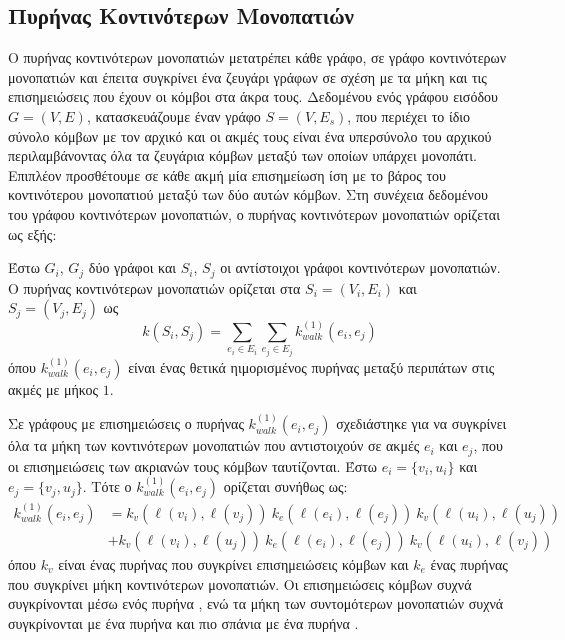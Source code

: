 \subsection{Πυρήνας Κοντινότερων Μονοπατιών}
\label{ssec:sp}
Ο πυρήνας κοντινότερων μονοπατιών  μετατρέπει κάθε γράφο, σε γράφο κοντινότερων μονοπατιών και έπειτα συγκρίνει ένα ζευγάρι γράφων σε σχέση με τα μήκη και τις επισημειώσεις που έχουν οι κόμβοι στα άκρα τους.
Δεδομένου ενός γράφου εισόδου $G=(V,E)$, κατασκευάζουμε έναν γράφο  $S=(V,E_s)$, που περιέχει το ίδιο σύνολο κόμβων με τον αρχικό και οι ακμές τους είναι ένα υπερσύνολο του αρχικού περιλαμβάνοντας όλα τα ζευγάρια κόμβων μεταξύ των οποίων υπάρχει μονοπάτι.
Επιπλέον προσθέτουμε σε κάθε ακμή μία επισημείωση ίση με το βάρος του κοντινότερου μονοπατιού μεταξύ των δύο αυτών κόμβων.
Στη συνέχεια δεδομένου του γράφου κοντινότερων μονοπατιών, ο πυρήνας κοντινότερων μονοπατιών ορίζεται ως εξής:
\begin{definition}
	Έστω $G_i$, $G_j$ δύο γράφοι και $S_i$, $S_j$ οι αντίστοιχοι γράφοι κοντινότερων μονοπατιών.
	Ο πυρήνας κοντινότερων μονοπατιών ορίζεται στα $S_i=(V_i,E_i)$ και $S_j=(V_j,E_j)$ ως
	\begin{equation}
		k(S_i,S_j) = \sum_{e_i \in E_i} \sum_{e_j \in E_j} k_{walk}^{(1)}(e_i, e_j)
	\end{equation}
	όπου $k_{walk}^{(1)}(e_i, e_j)$ είναι ένας θετικά ηιμορισμένος πυρήνας μεταξύ περιπάτων στις ακμές με μήκος $1$.
\end{definition}
Σε γράφους με επισημειώσεις ο πυρήνας $k_{walk}^{(1)}(e_i, e_j)$ σχεδιάστηκε για να συγκρίνει όλα τα μήκη των κοντινότερων μονοπατιών που αντιστοιχούν σε ακμές $e_i$ και $e_j$, που οι επισημειώσεις των ακριανών τους κόμβων ταυτίζονται.
Έστω $e_i = \{v_i, u_i\}$ και $e_j = \{v_j, u_j\}$.
Τότε ο $k_{walk}^{(1)}(e_i, e_j)$ ορίζεται συνήθως ως:
\begin{equation}
\begin{split}
	k_{walk}^{(1)}(e_i, e_j) &= k_v(\ell(v_i),\ell(v_j)) \ k_e(\ell(e_i),\ell(e_j)) \ k_v(\ell(u_i),\ell(u_j)) \\
	&+ k_v(\ell(v_i),\ell(u_j)) \ k_e(\ell(e_i),\ell(e_j)) \ k_v(\ell(u_i),\ell(v_j))
\end{split}
\end{equation}
όπου $k_v$ είναι ένας πυρήνας που συγκρίνει επισημειώσεις κόμβων και $k_e$ ένας πυρήνας που συγκρίνει μήκη κοντινότερων μονοπατιών.
Οι επισημειώσεις κόμβων συχνά συγκρίνονται μέσω ενός πυρήνα , ενώ τα μήκη των συντομότερων μονοπατιών συχνά συγκρίνονται με ένα πυρήνα  και πιο σπάνια με ένα πυρήνα  \cite{borgwardt2005shortest}.
